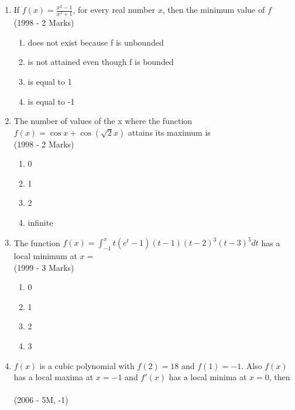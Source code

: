\documentclass[journal,12pt,twocolumn]{IEEEtran}
\theoremstyle{remark}
\begin{document}
    \begin{enumerate}
    \item{
            If $f(x) =  \frac{x^2-1}{x^2+1}$, for every real number $x$, then the minimum value of $f$ \\ \text{   } \hfill
                {(1998 - 2 Marks)}
            \begin{enumerate}
                \item does not exist because f is unbounded
                \item is not attained even though f is bounded
                \item is equal to 1
                \item is equal to -1
            \end{enumerate} }
    \item{
            The number of values of the x where the function $f(x)=\cos x + \cos(\sqrt{2}x)$ attains its maximum is \\ \text{   } \hfill
                {(1998 - 2 Marks)}
            \begin{enumerate}
                \item 0
                \item 1
                \item 2
                \item infinite
            \end{enumerate}
        }
    \item{
     
            The function $f(x)= \int_{-1}^x t(e^t-1)(t-1)(t-2)^3(t-3)^5dt$ has a local minimum at $x=$ \\ \text{   } \hfill
                {(1999 - 3 Marks)}

            \begin{enumerate}
                \item 0 
                \item 1
                \item 2
                \item 3
            \end{enumerate}
        
        }
    \item{
        
            $f(x)$ is a cubic polynomial with  $f(2)=18$ and $f(1)=-1$. Also $f(x)$ has a local maxima at $x=-1$ and $f'(x)$ has a local minima at $x=0$, then
            \\ \text{   } \\ \text{   } \hfill
                {(2006 - 5M, -1)}
            
}
\end{enumerate}
\end{document}
